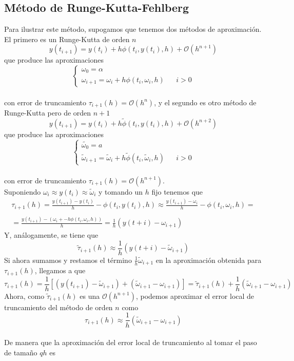 \subsection{Método de Runge-Kutta-Fehlberg}
Para ilustrar este método, supogamos que tenemos dos métodos de aproximación. El primero es un Runge-Kutta de orden $n$
$$
y(t_{i+1}) = y(t_i) + h\phi (t_i, y(t_i), h) + \mathcal{O}(h^{n+1})
$$
que produce las aproximaciones
$$
\left\{
\begin{array}{lll}
\omega_0 = \alpha & & \\
\omega_{i+1} = \omega_i + h\phi(t_i, \omega_i, h) & & i >0
\end{array}
\right.
$$
\\con error de truncamiento $\tau_{i+1}(h) = \mathcal{O}(h^n)$, y el segundo es otro método de Runge-Kutta pero de orden $n+1$
$$
y(t_{i+1}) = y(t_i) + h\tilde{\phi}(t_i, y(t_i), h) + \mathcal{O}(h^{n+2})
$$
que produce las aproximaciones
$$
\left\{
\begin{array}{lll}
\tilde{\omega_0} = a & & \\
\tilde{\omega}_{i+1} = \tilde{\omega}_i + h\tilde{\phi}(t_i, \tilde{\omega}_i, h) & & i >0
\end{array}
\right.
$$
\\con error de truncamiento $\tau_{i+1}(h) = \mathcal{O}(h^{n+1})$.\\
Suponiendo $\omega_i \approx y(t_i) \approx \tilde{\omega}_i$ y tomando un $h$ fijo tenemos que
$$
\begin{array}{l}
\tau_{i+1}(h) = \frac{y(t_{i+1}) - y(t_i)}{h} - \phi(t_i, y(t_i), h) \approx  \frac{y(t_{i+1}) - \omega_i}{h} - \phi(t_i, \omega_i, h) =\\
\\
 =\frac{y(t_{i+1}) - (\omega_i+ - h\phi(t_i, \omega_i, h))}{h} = \frac{1}{h}(y(t+i)-\omega_{i+1})
\end{array}
$$
Y, análogamente, se tiene que 
$$
\tilde{\tau}_{i+1}(h) \approx \frac{1}{h}(y(t+i)-\tilde{\omega}_{i+1})
$$
Si ahora sumamos y restamos el término $\frac{1}{h}\tilde{\omega}_{i+1}$ en la aproximación obtenida para $\tau_{i+1}(h)$, llegamos a que
$$
\tau_{i+1}(h) = \frac{1}{h}[(y(t_{i+1})-\tilde{\omega}_{i+1}) + (\tilde{\omega}_{i+1} - \omega_{i+1})] = \tilde{\tau}_{i+1}(h) + \frac{1}{h}(\tilde{\omega}_{i+1}-\omega_{i+1})
$$
Ahora, como $\tilde{\tau}_{i+1}(h)$ es una $\mathcal{O}(h^{n+1})$, podemos aproximar el error local de truncamiento del método de orden $n$ como
$$
\tau_{i+1}(h) \approx \frac{1}{h}(\tilde{\omega}_{i+1}-\omega_{i+1})
$$
\\De manera que la aproximación del error local de truncamiento al tomar el paso de tamaño $qh$ es
